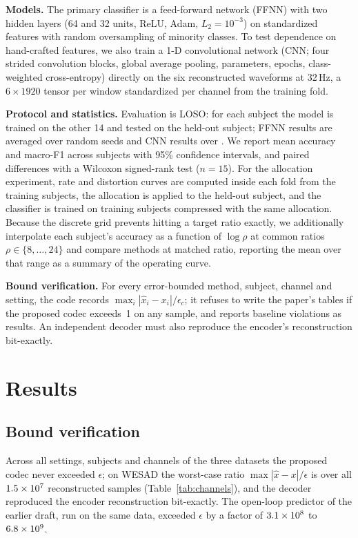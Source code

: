 \documentclass[journal,twoside,web]{ieeecolor}
\begin{document}
\textbf{Models.} The primary classifier is a feed-forward network (FFNN) with two hidden layers (64 and 32 units, ReLU, Adam, $L_2=10^{-3}$) on standardized features with random oversampling of minority classes. To test dependence on hand-crafted features, we also train a 1-D convolutional network (CNN; four strided convolution blocks, global average pooling, \cnnNParams{} parameters, \cnnEpochs{} epochs, class-weighted cross-entropy) directly on the six reconstructed waveforms at 32\,Hz, a $6\times1920$ tensor per window standardized per channel from the training fold.

\textbf{Protocol and statistics.} Evaluation is LOSO: for each subject the model is trained on the other 14 and tested on the held-out subject; FFNN results are averaged over \nSeeds{} random seeds and CNN results over \cnnNSeeds. We report mean accuracy and macro-F1 across subjects with 95\% confidence intervals, and paired differences with a Wilcoxon signed-rank test ($n=15$). For the allocation experiment, rate and distortion curves are computed inside each fold from the training subjects, the allocation is applied to the held-out subject, and the classifier is trained on training subjects compressed with the same allocation. Because the discrete grid prevents hitting a target ratio exactly, we additionally interpolate each subject's accuracy as a function of $\log\rho$ at common ratios $\rho\in\{8,\dots,24\}$ and compare methods at matched ratio, reporting the mean over that range as a summary of the operating curve.

\textbf{Bound verification.} For every error-bounded method, subject, channel and setting, the code records $\max_i|\hat{x}_i-x_i|/\epsilon_c$; it refuses to write the paper's tables if the proposed codec exceeds~1 on any sample, and reports baseline violations as results. An independent decoder must also reproduce the encoder's reconstruction bit-exactly.

\section{Results}
\label{sec:results}
\subsection{Bound verification}
\label{sec:verif}
Across all settings, subjects and channels of the three datasets the proposed codec never exceeded $\epsilon$; on WESAD the worst-case ratio $\max|\hat{x}-x|/\epsilon$ is \maxErrRatioAll{} over all $1.5\times10^{7}$ reconstructed samples (Table~\ref{tab:channels}), and the decoder reproduced the encoder reconstruction bit-exactly. The open-loop predictor of the earlier draft, run on the same data, exceeded $\epsilon$ by a factor of $3.1\times10^{8}$ to $6.8\times10^{9}$.
\end{document}

